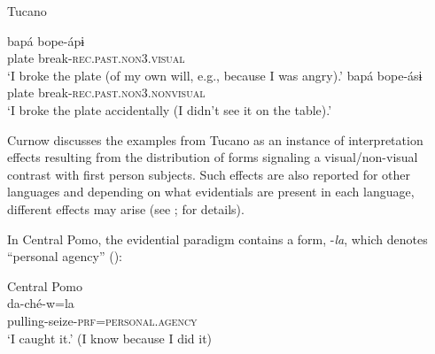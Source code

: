 \documentclass[output=paper]{langsci/langscibook}
\begin{document}
\begin{exe}
\ex Tucano\label{ex:hb2}
	\begin{xlist}
	\ex \label{ex:hb2a}
	\gll bapá bope-ápɨ\\
	plate break-\textsc{rec}.\textsc{past}.\textsc{non}3.\textsc{visual}\\
	\trans ‘I broke the plate (of my own will, e.g., because I was angry).’ 
	\ex \label{ex:hb2b}
	\gll bapá bope-ásɨ \\
	plate break-\textsc{rec}.\textsc{past}.\textsc{non}3.\textsc{nonvisual}\\
	\trans ‘I broke the plate accidentally (I didn't see it on the table).’ 	
	\end{xlist}
\end{exe}

Curnow discusses the examples from Tucano as an instance of interpretation effects resulting from the distribution of forms signaling a visual/non-visual contrast with first person subjects. Such effects are also reported for other languages and depending on what evidentials are present in each language, different effects may arise (see \citealt{Curnow2002b}; \citeyear{Curnow2003} for details).

In Central Pomo, the evidential paradigm contains a form, -\textit{la}, which denotes “personal agency” (\citealt[181]{Mithun1999}):

\begin{exe}
\ex Central Pomo\label{ex:hb3}\\
	\gll da-ché-w=la\\
	pulling-seize-\textsc{prf}=\textsc{personal}.\textsc{agency}\\
	\trans `I caught it.’ (I know because I did it) 
\end{exe}
\end{document}
